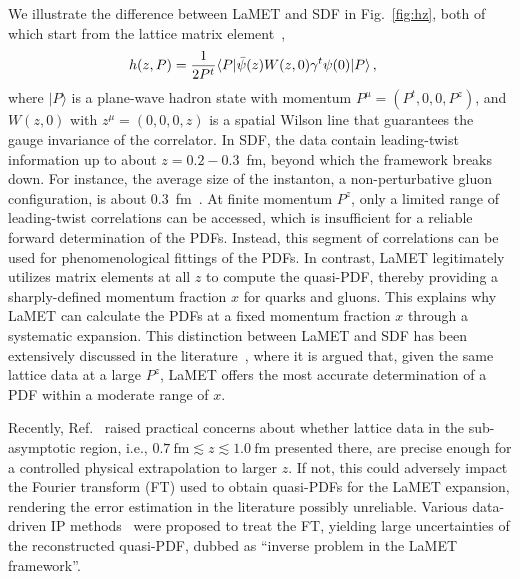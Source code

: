 \documentclass[prd,twocolumn,superscriptaddress,preprintnumbers,showpacs,nofootinbib,notitlepage,floatfix]{revtex4-2}
\DeclareRobustCommand{\fig}[1]{Fig.~\ref{fig:#1}}
\begin{document}
We illustrate the difference between LaMET and SDF in \fig{hz}, both of which start from the lattice matrix element~\cite{Ji:2013dva,Radyushkin:2017cyf},
\begin{align}
    h(z,P) &= {1\over 2P^t}\langle P| \bar{\psi}(z) W(z,0) \gamma^t \psi(0)|P\rangle\,,
\end{align}
where $|P\rangle$ is a plane-wave hadron state with momentum $P^\mu=(P^t,0,0,P^z)$, and $W(z,0)$ with $z^\mu=(0,0,0,z)$ is a spatial Wilson line that guarantees the gauge invariance of the correlator. In SDF, the data contain leading-twist information up to about $z=0.2-0.3$~fm, beyond which the framework breaks down. For instance, the average size of the instanton, a non-perturbative gluon configuration, is about 0.3~fm~\cite{Nowak:1996aj,Schafer:1996wv}. At finite momentum $P^z$, only a limited range of leading-twist correlations can be accessed, which is insufficient for a reliable forward determination of the PDFs. Instead, this segment of correlations can be used for phenomenological fittings of the PDFs.
In contrast, LaMET legitimately utilizes matrix elements at all $z$ to compute the quasi-PDF, thereby providing a sharply-defined momentum fraction $x$ for quarks and gluons. This explains why LaMET can calculate the PDFs at a fixed momentum fraction $x$ through a systematic expansion. This distinction between LaMET and SDF has been extensively discussed in the literature~\cite{Ji:2020ect,Ji:2020brr,Ji:2020byp,Ji:2022ezo,Ji:2024oka}, where it is argued that, given the same lattice data at a large $P^z$, LaMET offers the most accurate determination of a PDF within a moderate range of $x$.
 
Recently, Ref.~\cite{Dutrieux:2025jed} raised practical concerns about whether lattice data in the sub-asymptotic region, i.e., $0.7~\text{fm} \lesssim z \lesssim 1.0~\text{fm}$ presented there, are precise enough for a controlled physical extrapolation to larger $z$. If not, this could adversely impact the Fourier transform (FT) used to obtain quasi-PDFs for the LaMET expansion, rendering the error estimation in the literature possibly unreliable. Various data-driven IP methods~\cite{rietsch1976maximum,burnier2013bayesian,liang2020towards,backus1968resolving,DelDebbio2025Bayesian}
were proposed to treat the FT, yielding large uncertainties of the reconstructed quasi-PDF, dubbed as ``inverse problem in the LaMET framework''.
\end{document}
